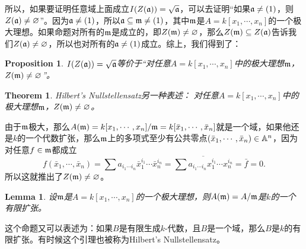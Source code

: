 \documentclass[9pt]{extbook}
\theoremstyle{plain}%
\newtheorem{pro}[defi]{Proposition}%
\newtheorem{theo}[defi]{Theorem}%
\newtheorem{lem}[defi]{Lemma}%
\begin{document}
所以，如果要证明任意域上面成立$I(Z(\mathfrak{a}))=\sqrt{\mathfrak{a}}$，可以去证明“如果$\mathfrak{a}\neq(1)$，则$Z(\mathfrak{a})\neq\varnothing$”。因为$\mathfrak{a}\neq(1)$，所以$\mathfrak{a}\subseteq \mathfrak{m} \neq(1)$，其中$\mathfrak{m}$是$A=k[x_1,\cdots,x_n]$的一个极大理想。如果命题对所有的$\mathfrak{m}$是成立的，即$Z(\mathfrak{m})\neq \varnothing$，那么$Z(\mathfrak{m})\subseteq Z(\mathfrak{a})$告诉我们$Z(\mathfrak{a})\neq \varnothing$，所以也对所有的$\mathfrak{a}\neq (1)$成立。综上，我们得到了：
\begin{pro}
$I(Z(\mathfrak{a}))=\sqrt{\mathfrak{a}}$等价于“对任意$A=k[x_1,\cdots,x_n]$中的极大理想$\mathfrak{m}$，$Z(\mathfrak{m})\neq\varnothing$”。
\end{pro}
\begin{theo}Hilbert's Nullstellensatz另一种表述：
对任意$A=k[x_1,\cdots,x_n]$中的极大理想$\mathfrak{m}$，$Z(\mathfrak{m})\neq\varnothing$。
\end{theo}
	由于$\mathfrak{m}$极大，那么$A(\mathfrak{m})=k[x_1,\cdots,x_n]/\mathfrak{m}=k[\bar{x}_1,\cdots,\bar{x}_n]$就是一个域，如果他还是$k$的一个代数扩张，那么$\mathfrak{m}$上的多项式至少有公共零点$(\bar{x}_1,\cdots,\bar{x}_n)\in \mathbb{A}^n$，因为对任意$f\in \mathfrak{m}$都成立
	\[
		f(\bar{x}_1,\cdots,\bar{x}_n)=\sum a_{i_1\cdots i_n} {\bar{x}}_1^{i_1}\cdots {\bar{x}}_n^{i_n}=\overline{\sum a_{i_1\cdots i_n} x_1^{i_1}\cdots x_n^{i_n}}=\bar{f}=0.
	\]
	所以这就推出了$Z(\mathfrak{m})\neq\varnothing$。
\begin{lem}
	设$\mathfrak{m}$是$A=k[x_1,\cdots,x_n]$的一个极大理想，则$A(\mathfrak{m})=A/\mathfrak{m}$是$k$的一个有限扩张。
	\label{l1.3}
\end{lem}
这个命题又可以表述为：如果$B$是有限生成$k$-代数，且$B$是一个域，那么$B$是$k$的有限扩张。有时候这个引理也被称为Hilbert's Nullstellensatz。
\end{document}
